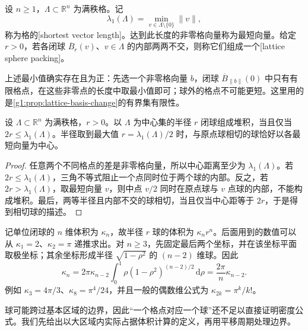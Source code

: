 \begin{definition}
	\label{g1:def:lattice-sphere-packing}
	设 \(n\ge1\)，\(\Lambda\subset\mathbb R^n\) 为满秩格。记
	\[
		\lambda_1(\Lambda)=\min_{v\in\Lambda\setminus\{0\}}\lVert v\rVert,
	\]
	称为格的[shortest vector length]。达到此长度的非零格向量称为最短向量。给定 \(r>0\)，若各闭球 \(\overline B_r(v)\)、\(v\in\Lambda\) 的内部两两不交，则称它们组成一个[lattice sphere packing]。
\end{definition}


上述最小值确实存在且为正：先选一个非零格向量 \(b\)，闭球 \(\overline B_{\lVert b\rVert}(0)\) 中只有有限格点，在这些非零点的长度中取最小值即可；球外的格点不可能更短。这里用的是\cref{g1:prop:lattice-basis-change}的有界集有限性。

\begin{proposition}
	\label{g1:prop:lattice-packing-radius}
	设 \(\Lambda\subset\mathbb R^n\) 为满秩格，\(r>0\)。以 \(\Lambda\) 为中心集的半径 \(r\) 闭球组成堆积，当且仅当 \(2r\le\lambda_1(\Lambda)\)。半径取到最大值 \(r=\lambda_1(\Lambda)/2\) 时，与原点球相切的球恰好以各最短向量为中心。
\end{proposition}
\begin{proof}
	任意两个不同格点的差是非零格向量，所以中心距离至少为 \(\lambda_1(\Lambda)\)。若 \(2r\le\lambda_1(\Lambda)\)，三角不等式阻止一个点同时位于两个球的内部。反之，若 \(2r>\lambda_1(\Lambda)\)，取最短向量 \(v\)，则中点 \(v/2\) 同时在原点球与 \(v\) 点球的内部，不能构成堆积。最后，两等半径且内部不交的球相切，当且仅当中心距等于 \(2r\)，于是得到相切球的描述。
\end{proof}

记单位闭球的 \(n\) 维体积为 \(\kappa_n\)，故半径 \(r\) 球的体积为 \(\kappa_n r^n\)。后面用到的数值可以从 \(\kappa_1=2\)、\(\kappa_2=\pi\) 递推求出。对 \(n\ge3\)，先固定最后两个坐标，并在该坐标平面取极坐标；其余坐标形成半径 \(\sqrt{1-\rho^2}\) 的 \((n-2)\) 维球。因此
\begin{equation}\label{g1:eq:unit-ball-volume-recurrence}
	\kappa_n=2\pi\kappa_{n-2}\int_0^1\rho(1-\rho^2)^{(n-2)/2}\,\mathrm{d}\rho
	=\frac{2\pi}{n}\kappa_{n-2}.
\end{equation}
例如 \(\kappa_3=4\pi/3\)、\(\kappa_8=\pi^4/24\)，并且一般的偶数维公式为 \(\kappa_{2k}=\pi^k/k!\)。

\ProseParagraphBreak

球可能跨过基本区域的边界，因此“一个格点对应一个球”还不足以直接证明密度公式。我们先给出以大区域内实际占据体积计算的定义，再用平移周期处理边界。

